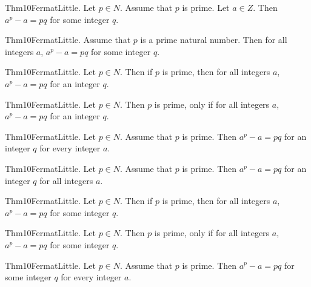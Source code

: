 \documentclass{article}
\begin{document}
Thm10FermatLittle. Let $p \in N$. Assume that $p$ is prime. Let $a \in Z$. Then $a ^ {p}- a = p q$ for some integer $q$.

Thm10FermatLittle. Assume that $p$ is a prime natural number. Then for all integers $a$, $a ^ {p}- a = p q$ for some integer $q$.

Thm10FermatLittle. Let $p \in N$. Then if $p$ is prime, then for all integers $a$, $a ^ {p}- a = p q$ for an integer $q$.

Thm10FermatLittle. Let $p \in N$. Then $p$ is prime, only if for all integers $a$, $a ^ {p}- a = p q$ for an integer $q$.

Thm10FermatLittle. Let $p \in N$. Assume that $p$ is prime. Then $a ^ {p}- a = p q$ for an integer $q$ for every integer $a$.

Thm10FermatLittle. Let $p \in N$. Assume that $p$ is prime. Then $a ^ {p}- a = p q$ for an integer $q$ for all integers $a$.

Thm10FermatLittle. Let $p \in N$. Then if $p$ is prime, then for all integers $a$, $a ^ {p}- a = p q$ for some integer $q$.

Thm10FermatLittle. Let $p \in N$. Then $p$ is prime, only if for all integers $a$, $a ^ {p}- a = p q$ for some integer $q$.

Thm10FermatLittle. Let $p \in N$. Assume that $p$ is prime. Then $a ^ {p}- a = p q$ for some integer $q$ for every integer $a$.
\end{document}
